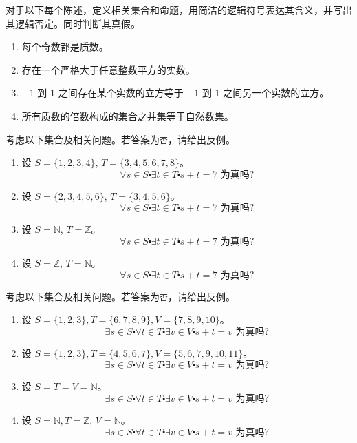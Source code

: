 \begin{exercise}
    对于以下每个陈述，定义相关集合和命题，用简洁的逻辑符号表达其含义，并写出其逻辑否定。同时判断其真假。

    \begin{enumerate}[label=(\alph*)]
        \item 每个奇数都是质数。
        \item 存在一个严格大于任意整数平方的实数。
        \item $-1$ 到 $1$ 之间存在某个实数的立方等于 $-1$ 到 $1$ 之间另一个实数的立方。
        \item 所有质数的倍数构成的集合之并集等于自然数集。
    \end{enumerate}  
\end{exercise}

\begin{exercise}
    考虑以下集合及相关问题。若答案为\verb|否|，请给出反例。

    \begin{enumerate}[label=(\alph*)]
        \item 设 $S = \{1, 2, 3, 4\}$, $T = \{3, 4, 5, 6, 7, 8\}$。
            \[\forall s \in S \centerdot \exists t \in T \centerdot s + t = 7 \text{\ 为真吗?}\]
        \item 设 $S = \{2, 3, 4, 5, 6\}$, $T = \{3, 4, 5, 6\}$。
            \[\forall s \in S \centerdot \exists t \in T \centerdot s + t = 7 \text{\ 为真吗?}\]
        \item 设 $S = \mathbb{N}$, $T = \mathbb{Z}$。
            \[\forall s \in S \centerdot \exists t \in T \centerdot s + t = 7 \text{\ 为真吗?}\]
        \item 设 $S = \mathbb{Z}$, $T = \mathbb{N}$。
            \[\forall s \in S \centerdot \exists t \in T \centerdot s + t = 7 \text{\ 为真吗?}\]
    \end{enumerate}  
\end{exercise}

\begin{exercise}
    考虑以下集合及相关问题。若答案为\verb|否|，请给出反例。

    \begin{enumerate}[label=(\alph*)]
        \item 设 $S = \{1, 2, 3\}, T = \{6, 7, 8, 9\}, V = \{7, 8, 9, 10\}$。
            \[\exists s \in S \centerdot \forall t \in T \centerdot \exists v \in V \centerdot s + t = v \text{\ 为真吗?}\]
        \item 设 $S = \{1, 2, 3\}, T = \{4, 5, 6, 7\}, V = \{5, 6, 7, 9, 10, 11\}$。
            \[\exists s \in S \centerdot \forall t \in T \centerdot \exists v \in V \centerdot s + t = v \text{\ 为真吗?}\]
        \item 设 $S = T = V = \mathbb{N}$。
            \[\exists s \in S \centerdot \forall t \in T \centerdot \exists v \in V \centerdot s + t = v \text{\ 为真吗?}\]
        \item 设 $S = \mathbb{N}, T = \mathbb{Z}$, $V = \mathbb{N}$。
            \[\exists s \in S \centerdot \forall t \in T \centerdot \exists v \in V \centerdot s + t = v \text{\ 为真吗?}\]
    \end{enumerate}  
\end{exercise}

